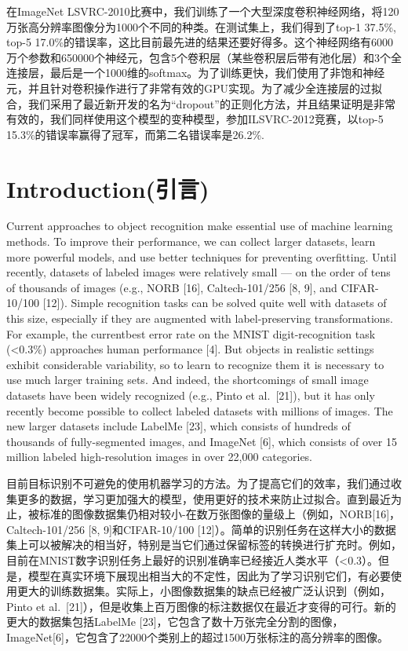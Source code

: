 \documentclass[12pt,a4paper,UTF8,twoside]{book}
\begin{document}
在ImageNet LSVRC-2010比赛中，我们训练了一个大型深度卷积神经网络，将120万张高分辨率图像分为1000个不同的种类。在测试集上，我们得到了top-1 37.5\%, top-5 17.0\%的错误率，这比目前最先进的结果还要好得多。这个神经网络有6000万个参数和650000个神经元，包含5个卷积层（某些卷积层后带有池化层）和3个全连接层，最后是一个1000维的softmax。为了训练更快，我们使用了非饱和神经元，并且针对卷积操作进行了非常有效的GPU实现。为了减少全连接层的过拟合，我们采用了最近新开发的名为``dropout''的正则化方法，并且结果证明是非常有效的，我们同样使用这个模型的变种模型，参加ILSVRC-2012竞赛，以top-5 15.3\%的错误率赢得了冠军，而第二名错误率是26.2\%.

\hypertarget{introductionux5f15ux8a00}{%
\section{Introduction(引言)}\label{introductionux5f15ux8a00}}

Current approaches to object recognition make essential use of machine learning methods. To improve their performance, we can collect larger datasets, learn more powerful models, and use better techniques for preventing overfitting. Until recently, datasets of labeled images were relatively small --- on the order of tens of thousands of images (e.g., NORB {[}16{]}, Caltech-101/256 {[}8, 9{]}, and CIFAR-10/100 {[}12{]}). Simple recognition tasks can be solved quite well with datasets of this size, especially if they are augmented with label-preserving transformations. For example, the currentbest error rate on the MNIST digit-recognition task (\textless0.3\%) approaches human performance {[}4{]}. But objects in realistic settings exhibit considerable variability, so to learn to recognize them it is necessary to use much larger training sets. And indeed, the shortcomings of small image datasets have been widely recognized (e.g., Pinto et al.~{[}21{]}), but it has only recently become possible to collect labeled datasets with millions of images. The new larger datasets include LabelMe {[}23{]}, which consists of hundreds of thousands of fully-segmented images, and ImageNet {[}6{]}, which consists of over 15 million labeled high-resolution images in over 22,000 categories.

目前目标识别不可避免的使用机器学习的方法。为了提高它们的效率，我们通过收集更多的数据，学习更加强大的模型，使用更好的技术来防止过拟合。直到最近为止，被标准的图像数据集仍相对较小-在数万张图像的量级上（例如，NORB{[}16{]}，Caltech-101/256 {[}8, 9{]}和CIFAR-10/100 {[}12{]}）。简单的识别任务在这样大小的数据集上可以被解决的相当好，特别是当它们通过保留标签的转换进行扩充时。例如，目前在MNIST数字识别任务上最好的识别准确率已经接近人类水平（\textless0.3）。但是，模型在真实环境下展现出相当大的不定性，因此为了学习识别它们，有必要使用更大的训练数据集。实际上，小图像数据集的缺点已经被广泛认识到（例如，Pinto et al.~{[}21{]}），但是收集上百万图像的标注数据仅在最近才变得的可行。新的更大的数据集包括LabelMe {[}23{]}，它包含了数十万张完全分割的图像，ImageNet{[}6{]}，它包含了22000个类别上的超过1500万张标注的高分辨率的图像。
\end{document}
